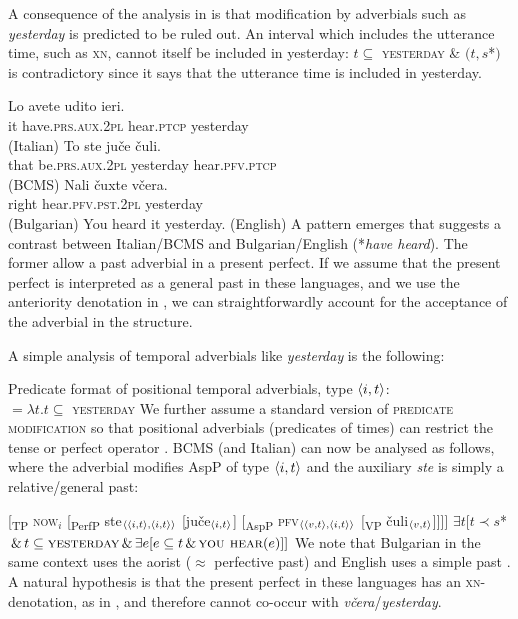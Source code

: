 \documentclass[output=paper,colorlinks,citecolor=brown]{langscibook}
\begin{document}
\largerpage

A consequence of the analysis in  is that modification by adverbials such as \textit{yesterday} is predicted to be ruled out. An interval which includes the utterance time, such as \textsc{xn}, cannot itself be included in yesterday: $t\subseteq$ \textsc{yesterday} \&  $(t,s$*$)$ is contradictory since it says that the utterance time is included in yesterday. 


\ea\ea\label{it-yest}\gll Lo avete udito ieri. \\ 
 it have.\textsc{prs}.\textsc{aux.2pl} hear.\textsc{ptcp} yesterday\\ \hfill (Italian)
 \ex\label{cr-yest}\gll To ste juče čuli. \\ that be.\textsc{prs}.\textsc{aux.2pl} yesterday hear.\textsc{pfv}.\textsc{ptcp}\\\hfill (BCMS)
\ex\label{bu-yest}\gll Nali čuxte včera.  \\
right hear.\textsc{pfv}.\textsc{pst.2pl} yesterday \\\hfill (Bulgarian)
 \ex\label{yest} You heard it yesterday. \hfill(English)
\z\z
A pattern emerges that suggests a contrast between Italian/BCMS and Bulgarian/English (*\textit{have heard}). The former allow a past adverbial in a present perfect. If we assume that the present perfect is interpreted as a general past in these languages, and we use the anteriority denotation in , we can straightforwardly account for the acceptance of the adverbial in the structure.

A simple analysis of
temporal adverbials like \textit{yesterday} is the following:

\ea \label{ex25}Predicate format of positional temporal adverbials, type $\langle{i,t}\rangle$: \\
${}=\lambda t.t \subseteq$ \textsc{yesterday}
\z
We further assume a standard version of \textsc{predicate} \textsc{modification} so that positional adverbials (predicates of times) can restrict the tense or perfect operator \citep{gronn_stechow2020}. BCMS (and Italian) can now be analysed as follows, where the adverbial modifies AspP of type $\langle{i,t}\rangle$ and the auxiliary \textit{ste} is simply a relative/general past:

\ea\ea
{[}{\textsubscript{TP}} \textsc{now}$_{i}$ [{\textsubscript{PerfP}} ste$_{\langle{\langle{i,t}\rangle,\langle{i,t}\rangle}\rangle}$  [juče$_{\langle{i,t}\rangle}$] [{\textsubscript{AspP}} \textsc{pfv}$_{\langle{\langle{v,t}\rangle,\langle{i,t}\rangle}\rangle}$ [{\textsubscript{VP}} čuli$_{\langle{v,t}\rangle}$]]]] 
\ex $\exists t[t \prec s$*$ \, \& \, t \subseteq \textsc{yesterday} \, \& \, \exists e[e
\subseteq t \, \& \, \textsc{you hear}(e)]]$
\z\z
We note that Bulgarian  in the same context  uses the aorist ($\approx$ perfective past)  and English uses a simple past  . A natural hypothesis is that the present perfect in these languages has an \textsc{xn}-denotation, as in , and therefore cannot co-occur with \textit{včera}/\textit{yesterday}.
\end{document}
